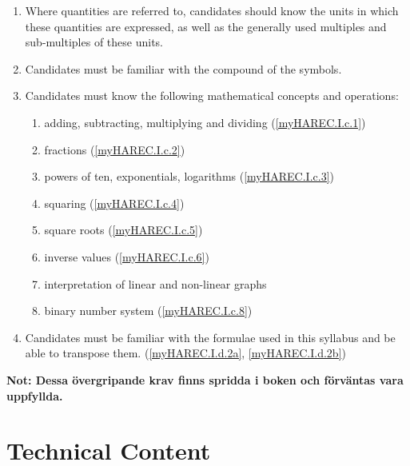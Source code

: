 \begin{enumerate}[label=\alph*]
\item Where quantities are referred to, candidates should know the units in
  which these quantities are expressed, as well as the generally used multiples
  and sub-multiples of these units.
\item Candidates must be familiar with the compound of the symbols.
\item Candidates must know the following mathematical concepts and operations:
\begin{enumerate}
\item adding, subtracting, multiplying and dividing (\ref{myHAREC.I.c.1})\label{HAREC.I.c.1}
\item fractions (\ref{myHAREC.I.c.2})\label{HAREC.I.c.2}
\item powers of ten, exponentials, logarithms (\ref{myHAREC.I.c.3})\label{HAREC.I.c.3}
\item squaring (\ref{myHAREC.I.c.4})\label{HAREC.I.c.4}
\item square roots (\ref{myHAREC.I.c.5})\label{HAREC.I.c.5}
\item inverse values (\ref{myHAREC.I.c.6})\label{HAREC.I.c.6}
\item interpretation of linear and non-linear graphs
\item binary number system (\ref{myHAREC.I.c.8})\label{HAREC.I.c.8}
\end{enumerate}
\item Candidates must be familiar with the formulae used in this syllabus and
  be able to transpose them. (\ref{myHAREC.I.d.2a}, \ref{myHAREC.I.d.2b})\label{HAREC.I.d}
\end{enumerate}

\textbf{Not: Dessa övergripande krav finns spridda i boken och förväntas vara
uppfyllda.}

\section{Technical Content}

\makeatletter
\renewcommand{\labelenumi}{\theenumi.}

\renewcommand{\theenumii}{\arabic{enumii}}
\renewcommand{\labelenumii}{\theenumi.\theenumii}
\renewcommand{\p@enumii}{\theenumi.}

\renewcommand{\theenumiii}{\arabic{enumiii}}
\renewcommand{\labelenumiii}{\theenumi.\theenumii.\theenumiii}
\renewcommand{\p@enumiii}{\theenumi.\theenumii.}

